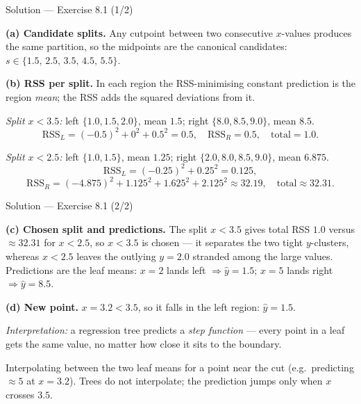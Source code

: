 \documentclass[aspectratio=169,11pt]{beamer}
\begin{document}
\begin{frame}{Solution --- Exercise 8.1 (1/2)}
\begin{solutionbox}
\textbf{(a) Candidate splits.} Any cutpoint between two consecutive $x$-values produces the same partition, so the midpoints are the canonical candidates: $s\in\{1.5,\,2.5,\,3.5,\,4.5,\,5.5\}$.

\medskip
\textbf{(b) RSS per split.} In each region the RSS-minimising constant prediction is the region \emph{mean}; the RSS adds the squared deviations from it.

\emph{Split $x<3.5$:} left $\{1.0,1.5,2.0\}$, mean $1.5$; right $\{8.0,8.5,9.0\}$, mean $8.5$.
\[ \mathrm{RSS}_L=(-0.5)^2+0^2+0.5^2=0.5,\quad \mathrm{RSS}_R=0.5,\quad \text{total}=1.0. \]

\emph{Split $x<2.5$:} left $\{1.0,1.5\}$, mean $1.25$; right $\{2.0,8.0,8.5,9.0\}$, mean $6.875$.
\[ \mathrm{RSS}_L=(-0.25)^2+0.25^2=0.125, \]
\[ \mathrm{RSS}_R=(-4.875)^2+1.125^2+1.625^2+2.125^2\approx 32.19,\quad \text{total}\approx 32.31. \]
\end{solutionbox}
\end{frame}

\begin{frame}{Solution --- Exercise 8.1 (2/2)}
\begin{solutionbox}
\textbf{(c) Chosen split and predictions.} The split $x<3.5$ gives total RSS $1.0$ versus $\approx32.31$ for $x<2.5$, so $x<3.5$ is chosen --- it separates the two tight $y$-clusters, whereas $x<2.5$ leaves the outlying $y=2.0$ stranded among the large values. Predictions are the leaf means: $x=2$ lands left $\Rightarrow \hat y=1.5$; $x=5$ lands right $\Rightarrow \hat y=8.5$.

\medskip
\textbf{(d) New point.} $x=3.2<3.5$, so it falls in the left region: $\hat y=1.5$.

\medskip
\emph{Interpretation:} a regression tree predicts a \emph{step function} --- every point in a leaf gets the same value, no matter how close it sits to the boundary.
\end{solutionbox}
\begin{mistake}
Interpolating between the two leaf means for a point near the cut (e.g.\ predicting $\approx5$ at $x=3.2$). Trees do not interpolate; the prediction jumps only when $x$ crosses $3.5$.
\end{mistake}
\end{frame}
\end{document}
